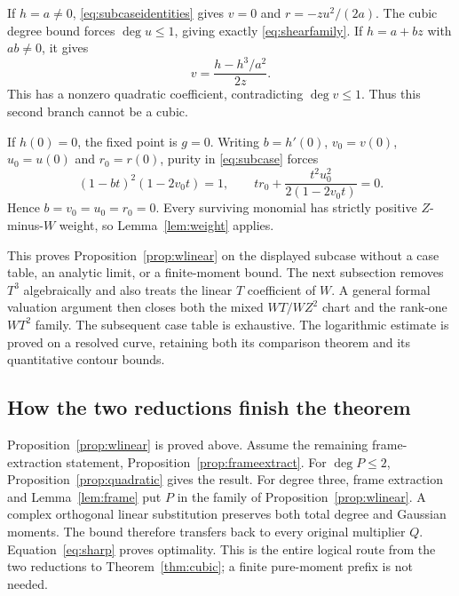 \documentclass[11pt]{article}
\theoremstyle{definition}\newtheorem{definition}[theorem]{Definition}
\theoremstyle{remark}\newtheorem{remark}[theorem]{Remark}
\begin{document}
If $h=a\ne0$, \eqref{eq:subcaseidentities} gives $v=0$ and
$r=-zu^2/(2a)$. The cubic degree bound forces $\deg u\leq1$, giving
exactly \eqref{eq:shearfamily}. If $h=a+bz$ with $ab\ne0$, it gives
\[
 v=\frac{h-h^3/a^2}{2z}.
\]
This has a nonzero quadratic coefficient, contradicting $\deg v\leq1$.
Thus this second branch cannot be a cubic.

If $h(0)=0$, the fixed point is $g=0$. Writing
$b=h'(0)$, $v_0=v(0)$, $u_0=u(0)$ and $r_0=r(0)$, purity in
\eqref{eq:subcase} forces
\[
 (1-bt)^2(1-2v_0t)=1,\qquad
 tr_0+\frac{t^2u_0^2}{2(1-2v_0t)}=0.
\]
Hence $b=v_0=u_0=r_0=0$. Every surviving monomial has strictly positive
$Z$-minus-$W$ weight, so Lemma~\ref{lem:weight} applies.

This proves Proposition~\ref{prop:wlinear} on the displayed subcase
without a case table, an analytic limit, or a finite-moment bound.
The next subsection removes $T^3$ algebraically and also treats the
linear $T$ coefficient of $W$. A general formal valuation argument then
closes both the mixed $WT/WZ^2$ chart and the rank-one $WT^2$ family. The subsequent case table is exhaustive. The logarithmic estimate
is proved on a resolved curve, retaining both its comparison theorem
and its quantitative contour bounds.







\subsection{How the two reductions finish the theorem}
Proposition~\ref{prop:wlinear} is proved above. Assume the remaining
frame-extraction statement, Proposition~\ref{prop:frameextract}.
For $\deg P\leq2$, Proposition~\ref{prop:quadratic} gives the result.
For degree three, frame extraction and Lemma~\ref{lem:frame} put $P$
in the family of Proposition~\ref{prop:wlinear}. A complex orthogonal
linear substitution preserves both total degree and Gaussian moments.
The bound therefore transfers back to every original multiplier $Q$.
Equation~\eqref{eq:sharp} proves optimality. This is the entire logical
route from the two reductions to Theorem~\ref{thm:cubic}; a finite
pure-moment prefix is not needed.
\end{document}
